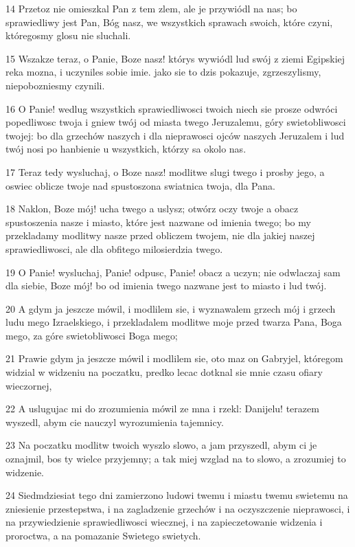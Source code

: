 \par 14 Przetoz nie omieszkal Pan z tem zlem, ale je przywiódl na nas; bo sprawiedliwy jest Pan, Bóg nasz, we wszystkich sprawach swoich, które czyni, któregosmy glosu nie sluchali.
\par 15 Wszakze teraz, o Panie, Boze nasz! którys wywiódl lud swój z ziemi Egipskiej reka mozna, i uczyniles sobie imie. jako sie to dzis pokazuje, zgrzeszylismy, niepobozniesmy czynili.
\par 16 O Panie! wedlug wszystkich sprawiedliwosci twoich niech sie prosze odwróci popedliwosc twoja i gniew twój od miasta twego Jeruzalemu, góry swietobliwosci twojej: bo dla grzechów naszych i dla nieprawosci ojców naszych Jeruzalem i lud twój nosi po hanbienie u wszystkich, którzy sa okolo nas.
\par 17 Teraz tedy wysluchaj, o Boze nasz! modlitwe slugi twego i prosby jego, a oswiec oblicze twoje nad spustoszona swiatnica twoja, dla Pana.
\par 18 Naklon, Boze mój! ucha twego a uslysz; otwórz oczy twoje a obacz spustoszenia nasze i miasto, które jest nazwane od imienia twego; bo my przekladamy modlitwy nasze przed obliczem twojem, nie dla jakiej naszej sprawiedliwosci, ale dla obfitego milosierdzia twego.
\par 19 O Panie! wysluchaj, Panie! odpusc, Panie! obacz a uczyn; nie odwlaczaj sam dla siebie, Boze mój! bo od imienia twego nazwane jest to miasto i lud twój.
\par 20 A gdym ja jeszcze mówil, i modlilem sie, i wyznawalem grzech mój i grzech ludu mego Izraelskiego, i przekladalem modlitwe moje przed twarza Pana, Boga mego, za góre swietobliwosci Boga mego;
\par 21 Prawie gdym ja jeszcze mówil i modlilem sie, oto maz on Gabryjel, któregom widzial w widzeniu na poczatku, predko lecac dotknal sie mnie czasu ofiary wieczornej,
\par 22 A uslugujac mi do zrozumienia mówil ze mna i rzekl: Danijelu! terazem wyszedl, abym cie nauczyl wyrozumienia tajemnicy.
\par 23 Na poczatku modlitw twoich wyszlo slowo, a jam przyszedl, abym ci je oznajmil, bos ty wielce przyjemny; a tak miej wzglad na to slowo, a zrozumiej to widzenie.
\par 24 Siedmdziesiat tego dni zamierzono ludowi twemu i miastu twemu swietemu na zniesienie przestepstwa, i na zagladzenie grzechów i na oczyszczenie nieprawosci, i na przywiedzienie sprawiedliwosci wiecznej, i na zapieczetowanie widzenia i proroctwa, a na pomazanie Swietego swietych.

